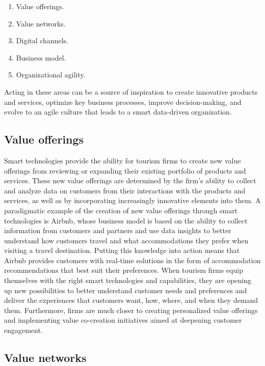 \documentclass[
  letterpaper,
  DIV=11,
  numbers=noendperiod]{scrreprt}
\begin{document}
\begin{enumerate}
\def\labelenumi{\arabic{enumi}.}
\item
  Value offerings.
\item
  Value networks.
\item
  Digital channels.
\item
  Business model.
\item
  Organizational agility.
\end{enumerate}

Acting in these areas can be a source of inspiration to create
innovative products and services, optimize key business processes,
improve decision-making, and evolve to an agile culture that leads to a
smart data-driven organization.

\hypertarget{value-offerings}{%
\subsection{Value offerings}\label{value-offerings}}

Smart technologies provide the ability for tourism firms to create new
value offerings from reviewing or expanding their existing portfolio of
products and services. These new value offerings are determined by the
firm's ability to collect and analyze data on customers from their
interactions with the products and services, as well as by incorporating
increasingly innovative elements into them. A paradigmatic example of
the creation of new value offerings through smart technologies is
Airbnb, whose business model is based on the ability to collect
information from customers and partners and use data insights to better
understand how customers travel and what accommodations they prefer when
visiting a travel destination. Putting this knowledge into action means
that Airbnb provides customers with real-time solutions in the form of
accommodation recommendations that best suit their preferences. When
tourism firms equip themselves with the right smart technologies and
capabilities, they are opening up new possibilities to better understand
customer needs and preferences and deliver the experiences that
customers want, how, where, and when they demand them. Furthermore,
firms are much closer to creating personalized value offerings and
implementing value co-creation initiatives aimed at deepening customer
engagement.

\hypertarget{value-networks}{%
\subsection{Value networks}\label{value-networks}}
\end{document}
